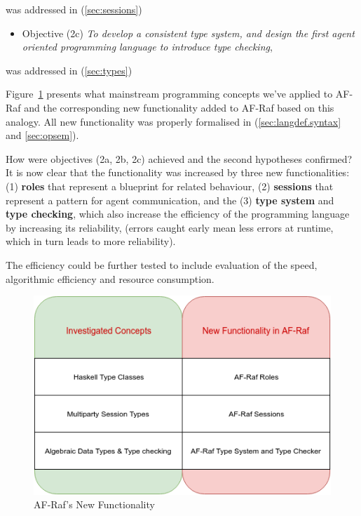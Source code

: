 \documentclass[a4paper,12pt,oneside,fleqn]{book} %
\begin{document}
{  was addressed in (\autoref{sec:sessions})
\begin{itemize}
\item Objective (2c) \textit{To develop a consistent type system,
    and design the first agent oriented programming language to introduce
  type checking}, 
  
\end{itemize}
  was addressed in (\autoref{sec:types})

Figure~\ref{fig:newFunct} presents what mainstream programming concepts we've applied to AF-Raf and the corresponding new functionality added to AF-Raf
based on this analogy. All new functionality was properly formalised in
(\autoref{sec:langdef.syntax} and \autoref{sec:opsem}).

How were objectives (2a, 2b, 2c) achieved and the second hypotheses
confirmed? It is now clear that the functionality was increased by three
new functionalities: (1) \textbf{roles} that represent a blueprint for
related behaviour, (2) \textbf{sessions} that represent a pattern for agent
communication, and the (3) \textbf{type system} and \textbf{type checking},
which also increase the efficiency of the programming language by
increasing its reliability, (errors caught early mean less errors at
runtime, which in turn leads to more reliability).

The efficiency could be further tested to include evaluation of the speed,
algorithmic efficiency and resource consumption.

\begin{figure}\footnotesize %
\includegraphics{NewFunctionality.png}
\caption{AF-Raf's New Functionality}
\label{fig:newFunct}
\end{figure} %


}
\end{document}
